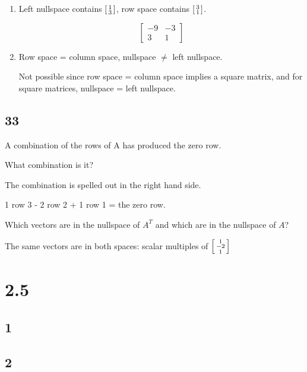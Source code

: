 \documentclass[12pt,letterpaper]{article}
\begin{document}
\begin{enumerate}
        \item
          Left nullspace contains $\begin{bsmallmatrix}1 \\ 3\end{bsmallmatrix}$, row space contains $\begin{bsmallmatrix}3 \\ 1\end{bsmallmatrix}$.

          \[
            \begin{bmatrix}
              -9 & -3 \\
              3 & 1
            \end{bmatrix}
          \]

        \item
          Row space = column space, nullspace $\ne$ left nullspace.

          Not possible since row space = column space implies a square matrix, and for square matrices, nullspace = left nullspace.
      \end{enumerate}
    \subsection*{33}
      A combination of the rows of A has produced the zero row.

      What combination is it?

      The combination is spelled out in the right hand side.

      1 row 3 - 2 row 2 + 1 row 1 = the zero row.

      Which vectors are in the nullspace of $A^T$ and which are in the nullspace of $A$?

      The same vectors are in both spaces: scalar multiples of $\begin{bsmallmatrix}1 \\ -2 \\ 1\end{bsmallmatrix}$

  \section*{2.5}
    \subsection*{1}
    \subsection*{2}
\end{document}
